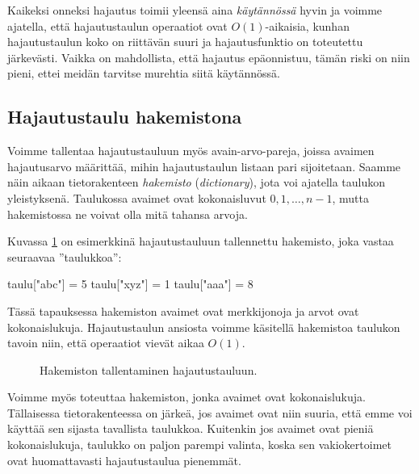 Kaikeksi onneksi hajautus toimii yleensä aina \emph{käytännössä}
hyvin ja voimme ajatella, että hajautustaulun operaatiot ovat
$O(1)$-aikaisia, kunhan hajautustaulun koko on riittävän suuri ja
hajautusfunktio on toteutettu järke\-västi.
Vaikka on mahdollista, että hajautus epäonnistuu,
tämän riski on niin pieni, ettei meidän tarvitse murehtia
siitä käytännössä.

\subsection{Hajautustaulu hakemistona}


Voimme tallentaa hajautustauluun myös
avain-arvo-pareja, joissa avaimen hajautusarvo määrittää,
mihin hajautustaulun listaan pari sijoitetaan.
Saamme näin aikaan tietorakenteen \emph{hakemisto} (\emph{dictionary}),
jota voi ajatella taulukon yleistyksenä.
Taulukossa avaimet ovat kokonaisluvut $0,1,\dots,n-1$,
mutta hakemistossa ne voivat olla mitä tahansa arvoja.

Kuvassa \ref{fig:hajhak} on esimerkkinä hajautustauluun
tallennettu hakemisto, joka vastaa seuraavaa ''taulukkoa'':

\begin{code}
taulu["abc"] = 5
taulu["xyz"] = 1
taulu["aaa"] = 8
\end{code}

Tässä tapauksessa hakemiston avaimet ovat merkkijonoja
ja arvot ovat kokonaislukuja.
Hajautustaulun ansiosta voimme käsitellä hakemistoa
taulukon tavoin niin, että operaatiot vievät aikaa $O(1)$.

\begin{figure}
\center
{}
\caption{Hakemiston tallentaminen hajautustauluun.}
\label{fig:hajhak}
\end{figure}

Voimme myös toteuttaa hakemiston, jonka avaimet ovat kokonaislukuja.
Tällaisessa tietorakenteessa on järkeä, jos avaimet ovat niin suuria,
että emme voi käyttää sen sijasta tavallista taulukkoa.
Kuitenkin jos avaimet ovat pieniä kokonaislukuja,
taulukko on paljon parempi valinta, koska sen vakiokertoimet
ovat huomattavasti hajautustaulua pienemmät.

